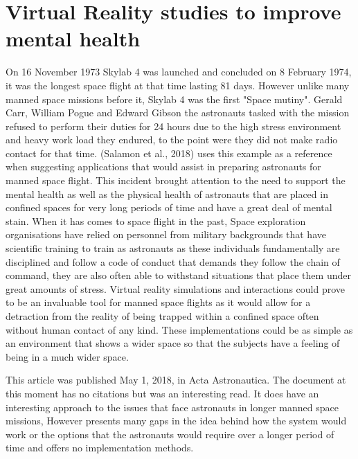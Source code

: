 \documentclass[10pt,journal,compsoc]{IEEEtran}
\begin{document}
	\section{Virtual Reality studies to improve mental health}
	 On 16 November 1973 Skylab 4 was launched and concluded on 8 February 1974, it was the longest space flight at that time lasting 81 days. However unlike many manned space missions before it, Skylab 4 was the first "Space mutiny". Gerald Carr, William Pogue and Edward Gibson the astronauts tasked with the mission refused to perform their duties for 24 hours due to the high stress environment and heavy work load they endured, to the point were they did not make radio contact for that time. (Salamon et al., 2018) uses this example as a reference when suggesting applications that would assist in preparing astronauts for manned space flight. This incident brought attention to the need to support the mental health as well as the physical health of  astronauts that are placed in confined spaces for very long periods of time and have a great deal of mental stain. When it has comes to space flight in the past, Space exploration organisations have relied on personnel from military backgrounds that have scientific training to train as astronauts as these individuals fundamentally are disciplined and follow a code of conduct that demands they follow the chain of command, they are also often able to withstand situations that place them under great amounts of stress. Virtual reality simulations and interactions could prove to be an invaluable tool for manned space flights as it would allow for a detraction from the reality of being trapped within a confined space often without human contact of any kind. These implementations could be as simple as an environment that shows a wider space so that the subjects have a feeling of being in a much wider space.\newline 
	 
	 This article was published May 1, 2018, in Acta Astronautica. The document at this moment has no citations but was an interesting read. It does have an interesting approach to the issues that face astronauts in longer manned space missions, However presents many gaps in the idea behind how the system would work or the options that the astronauts would require over a longer period of time and offers no implementation methods.\newline
	 
\end{document}
